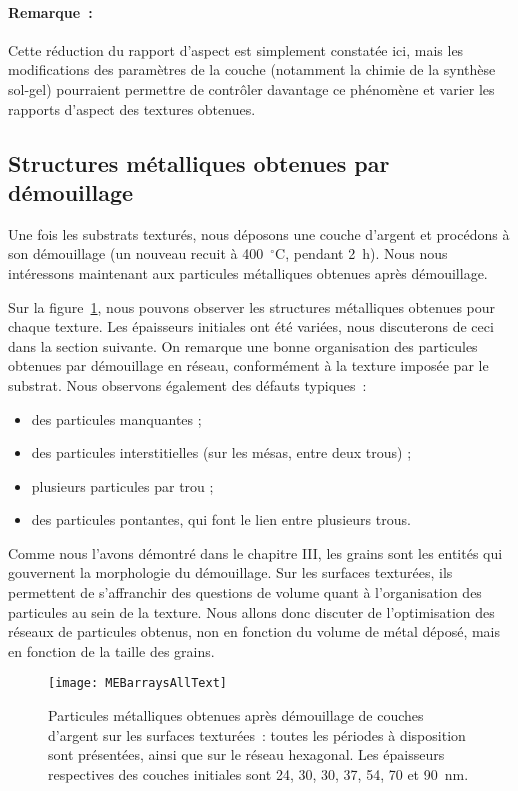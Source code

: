 \paragraph*{Remarque~:} Cette réduction du rapport d'aspect est simplement constatée ici, mais les modifications des paramètres de la couche (notamment la chimie de la synthèse sol-gel) pourraient permettre de contrôler davantage ce phénomène et varier les rapports d'aspect des textures obtenues.\par 

	\subsection{Structures métalliques obtenues par démouillage}
Une fois les substrats texturés, nous déposons une couche d'argent et procédons à son démouillage (un nouveau recuit à 400~$^\circ$C, pendant 2~h). Nous nous intéressons maintenant aux particules métalliques obtenues après démouillage.\par 
Sur la figure~\ref{MEBarraysAllText}, nous pouvons observer les structures métalliques obtenues pour chaque texture. Les épaisseurs initiales ont été variées, nous discuterons de ceci dans la section suivante. On remarque une bonne organisation des particules obtenues par démouillage en réseau, conformément à la texture imposée par le substrat. Nous observons également des défauts typiques~:
\begin{itemize}
\item des particules manquantes ;
\item des particules interstitielles (sur les mésas, entre deux trous) ;
\item plusieurs particules par trou ;
\item des particules pontantes, qui font le lien entre plusieurs trous.
\end{itemize}
Comme nous l'avons démontré dans le chapitre III, les grains sont les entités qui gouvernent la morphologie du démouillage. Sur les surfaces texturées, ils permettent de s'affranchir des questions de volume quant à l'organisation des particules au sein de la texture. Nous allons donc discuter de l'optimisation des réseaux de particules obtenus, non en fonction du volume de métal déposé, mais en fonction de la taille des grains.\par 
\begin{figure}[!htb]
\centering
\texttt{[image: MEBarraysAllText]}
\caption{Particules métalliques obtenues après démouillage de couches d'argent sur les surfaces texturées~: toutes les périodes à disposition sont présentées, ainsi que sur le réseau hexagonal. Les épaisseurs respectives des couches initiales sont 24, 30, 30, 37, 54, 70 et 90~nm.}
\label{MEBarraysAllText}
\end{figure}

